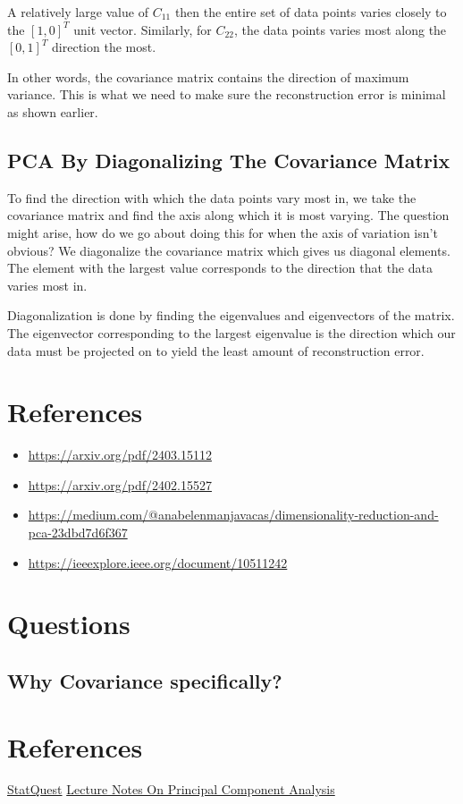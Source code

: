 \documentclass[11pt]{article}
\begin{document}
A relatively large value of \(C_{11}\) then the entire set of data points varies closely to the \([1,0]^T\) unit vector. Similarly, for \(C_{22}\), the data points varies most along the \([0,1]^T\) direction the most.

In other words, the covariance matrix contains the direction of maximum variance. This is what we need to make sure the reconstruction error is minimal as shown earlier.
\subsection{PCA By Diagonalizing The Covariance Matrix}
\label{sec:orgc36b48c}

To find the direction with which the data points vary most in, we take the covariance matrix and find the axis along which it is most varying. The question might arise, how do we go about doing this for when the axis of variation isn't obvious? We diagonalize the covariance matrix which gives us diagonal elements. The element with the largest value corresponds to the direction that the data varies most in.

Diagonalization is done by finding the eigenvalues and eigenvectors of the matrix. The eigenvector corresponding to the largest eigenvalue is the direction which our data must be projected on to yield the least amount of reconstruction error.
\section{References}
\label{sec:org5c7c9f1}
\begin{itemize}
\item \url{https://arxiv.org/pdf/2403.15112}
\item \url{https://arxiv.org/pdf/2402.15527}
\item \url{https://medium.com/@anabelenmanjavacas/dimensionality-reduction-and-pca-23dbd7d6f367}
\item \url{https://ieeexplore.ieee.org/document/10511242}
\end{itemize}
\section{Questions}
\label{sec:org3331f7c}
\subsection{Why Covariance specifically?}
\label{sec:orgf369f84}
\section{References}
\label{sec:orga933a64}
\href{https:www.youtube.com/watch?v=FgakZw6K1QQ\&t=574s}{StatQuest}
\href{file:///home/adithya/University-Latex-Notes/Mathematics For Intelligent Systems 3/assignment-1/LectureNotes-PCA.pdf}{Lecture Notes On Principal Component Analysis}
\end{document}
